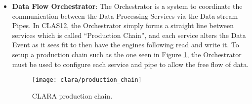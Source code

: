 \begin{itemize}
        \item \textbf{Data Flow Orchestrator}: The Orchestrator is a system to coordinate the communication between the Data Processing Services via the Data-stream Pipes.
        In CLAS12, the Orchestrator simply forms a straight line between services which is called ``Production Chain'', and each service alters the Data Event as it sees fit to then have the engines following read and write it.
        To setup a production chain such as the one seen in Figure \ref{fig:clara_production_chain}, the Orchestrator must be used to configure each service and pipe to allow the free flow of data.
        
            \begin{figure}[ht]
                \centering
                \texttt{[image: clara/production\_chain]}
                \caption{\label{fig:clara_production_chain} CLARA production chain.}
            \end{figure}
            
    \end{itemize}